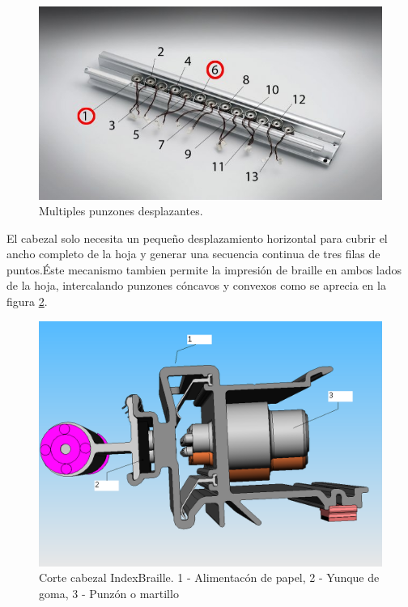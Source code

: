 \begin{figure}[htp]
\centering
\includegraphics[width=12cm]{./img/embosser_index_multiple_hammers.png}
\caption{Multiples punzones desplazantes.}
\label{fig:embosser_index_multiple_hammers}
\end{figure}

El cabezal solo necesita un peque\~no desplazamiento horizontal para cubrir el
ancho completo de la hoja y generar una secuencia continua de tres filas de
puntos.\'Este mecanismo tambien permite la impresi\'on de braille en ambos
lados de la hoja, intercalando punzones c\'oncavos y convexos como se aprecia
en la figura \ref{fig:embosser_index_cut_hammers}.

\begin{figure}[htp]
\centering
\includegraphics[width=13cm]{./img/embosser_index_cut_hammers.png}
\caption{Corte cabezal IndexBraille. 1 - Alimentac\'on de papel, 2 - Yunque de
goma, 3 - Punz\'on o martillo}
\label{fig:embosser_index_cut_hammers}
\end{figure}

